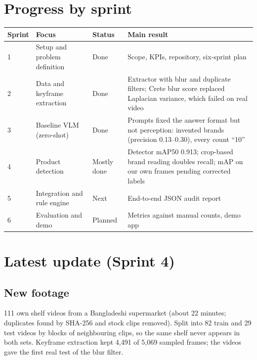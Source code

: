 \documentclass[10pt,a4paper]{article}
\begin{document}
\section*{Progress by sprint}
\begin{center}
\small
\begin{tabular}{@{}l p{4.2cm} l p{6.6cm}@{}}
\toprule
Sprint & Focus & Status & Main result \\
\midrule
1 & Setup and problem definition & Done & Scope, KPIs, repository, six-sprint plan \\
2 & Data and keyframe extraction & Done & Extractor with blur and duplicate filters; Crete blur score replaced Laplacian variance, which failed on real video \\
3 & Baseline VLM (zero-shot) & Done & Prompts fixed the answer format but not perception: invented brands (precision 0.13--0.30), every count ``10'' \\
4 & Product detection & Mostly done & Detector mAP50 0.913; crop-based brand reading doubles recall; mAP on our own frames pending corrected labels \\
5 & Integration and rule engine & Next & End-to-end JSON audit report \\
6 & Evaluation and demo & Planned & Metrics against manual counts, demo app \\
\bottomrule
\end{tabular}
\end{center}

\section*{Latest update (Sprint 4)}

\subsection*{New footage}
111 own shelf videos from a Bangladeshi supermarket (about 22 minutes; duplicates found by SHA-256
and stock clips removed). Split into 82 train and 29 test videos by blocks of neighbouring clips, so
the same shelf never appears in both sets. Keyframe extraction kept 4{,}491 of 5{,}069 sampled
frames; the videos gave the first real test of the blur filter.
\end{document}
